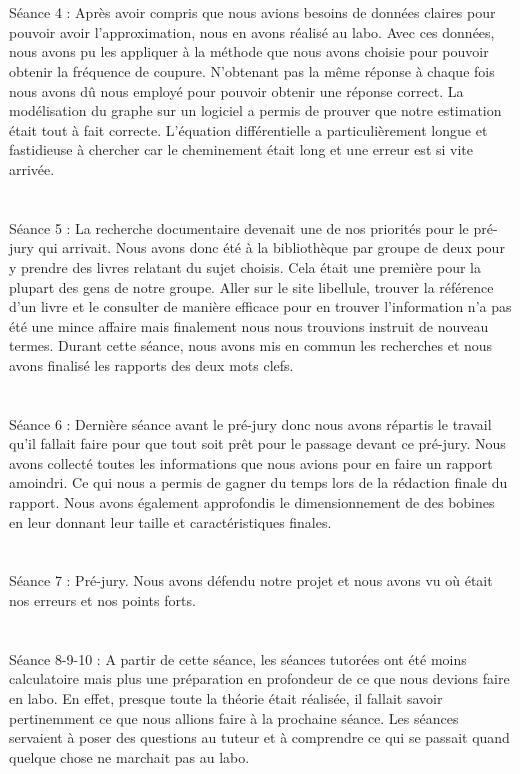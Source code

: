 \documentclass{report}
\begin{document}
\section{}
Séance 4 : Après avoir compris que nous avions besoins de données claires pour pouvoir avoir l’approximation, nous en avons réalisé au labo.  Avec ces données, nous avons pu les appliquer à la méthode que nous avons choisie pour pouvoir obtenir la fréquence de coupure.  N’obtenant pas la même réponse à chaque fois nous avons dû nous employé pour pouvoir obtenir une réponse correct.  La modélisation du graphe sur un logiciel a permis de prouver que notre estimation était tout à fait correcte.  L’équation différentielle a particulièrement longue et fastidieuse à chercher car le cheminement était long et une erreur est si vite arrivée.

\section{}
Séance 5 : La recherche documentaire devenait une de nos priorités pour le pré-jury qui arrivait.  Nous avons donc été à la bibliothèque par groupe de deux pour y prendre des livres relatant du sujet choisis.  Cela était une première pour la plupart des gens de notre groupe.  Aller sur le site libellule, trouver la référence d’un livre et le consulter de manière efficace pour en trouver l’information n’a pas été une mince affaire mais finalement nous nous trouvions instruit de nouveau termes.  Durant cette séance, nous avons mis en commun les recherches et nous avons finalisé les rapports des deux mots clefs.  

\section{}
Séance 6 : Dernière séance avant le pré-jury donc nous avons répartis le travail qu’il fallait faire pour que tout soit prêt pour le passage devant ce pré-jury.  Nous avons collecté toutes les informations que nous avions pour en faire un rapport amoindri.   Ce qui nous a permis de gagner du temps lors de la rédaction finale du rapport.  Nous avons également approfondis le dimensionnement de des bobines en leur donnant leur taille et caractéristiques finales.  

\section{}
Séance 7 : Pré-jury.  Nous avons défendu notre projet et nous avons vu où était nos erreurs et nos points forts.  

\section{}
Séance 8-9-10 : A partir de cette séance, les séances tutorées ont été moins calculatoire mais plus une préparation en profondeur de ce que nous devions faire en labo.  En effet, presque toute la théorie était réalisée, il fallait savoir pertinemment ce que nous allions faire à la prochaine séance.   Les séances servaient à poser des questions au tuteur et à comprendre ce qui se passait quand quelque chose ne marchait pas au labo.
\end{document}
